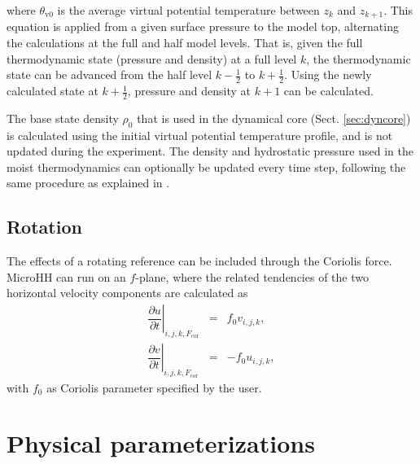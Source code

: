 \documentclass[gmd,manuscript]{copernicus}
\begin{document}
\noindent where $\theta_\mathrm{v0}$ is the average virtual potential temperature between $z_k$ and $z_{k+1}$. This equation is applied from a given surface pressure to the model top, alternating the calculations at the full and half model levels. That is, given the full thermodynamic state (pressure and density) at a full level $k$, the thermodynamic state can be advanced from the half level $k-\frac{1}{2}$ to $k+\frac{1}{2}$. Using the newly calculated state at $k+\frac{1}{2}$, pressure and density at $k+1$ can be calculated. 

The base state density $\rho_0$ that is used in the dynamical core (Sect. \ref{sec:dyncore}) is calculated using the initial virtual potential temperature profile, and is not updated during the experiment. The density and hydrostatic pressure used in the moist thermodynamics can optionally be updated every time step, following the same procedure as explained in \citet{Boing2014}.

\subsection{Rotation}
The effects of a rotating reference can be included through the Coriolis force. MicroHH can run on an $f$-plane, where the related tendencies of the two horizontal velocity components are calculated as
\begin{eqnarray}
\left. \dfrac{\partial u}{\partial t}\right|_{i,j,k,F_\textrm{cor}} & = & f_0 v_{i,j,k},\\
\left. \dfrac{\partial v}{\partial t}\right|_{i,j,k,F_\textrm{cor}} & = & -f_0 u_{i,j,k},
\end{eqnarray}
with $f_0$ as Coriolis parameter specified by the user.

\section{Physical parameterizations}\label{sec:parametrizations}
\end{document}
